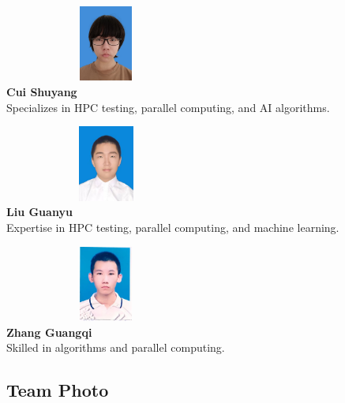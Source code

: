 \documentclass[a4paper,12pt]{article}
\begin{document}
\begin{table}[H]
\begin{center}
\begin{minipage}{0.45\textwidth}
    \centering
    \includegraphics[width=0.5\textwidth, height=2.5cm, keepaspectratio]{images/team/Cui_Shuyang.png}\\[0.3cm]
    \textbf{Cui Shuyang}\\[0.3cm]
    \small{Specializes in HPC testing, parallel computing, and AI algorithms.}
\end{minipage}
\begin{minipage}{0.45\textwidth}
    \centering
    \includegraphics[width=0.5\textwidth, height=2.5cm, keepaspectratio]{images/team/Liu_Guanyu.jpg}\\[0.3cm]
    \textbf{Liu Guanyu}\\[0.3cm]
    \small{Expertise in HPC testing, parallel computing, and machine learning.}
\end{minipage}

\vspace{1cm}

\begin{minipage}{0.45\textwidth}
    \centering
    \includegraphics[width=0.5\textwidth, height=2.5cm, keepaspectratio]{images/team/Zhang_Guangqi.jpg}\\[0.3cm]
    \textbf{Zhang Guangqi}\\[0.3cm]
    \small{Skilled in algorithms and parallel computing.}
\end{minipage}
\end{center}
\end{table}

\subsection{Team Photo}
\end{document}
